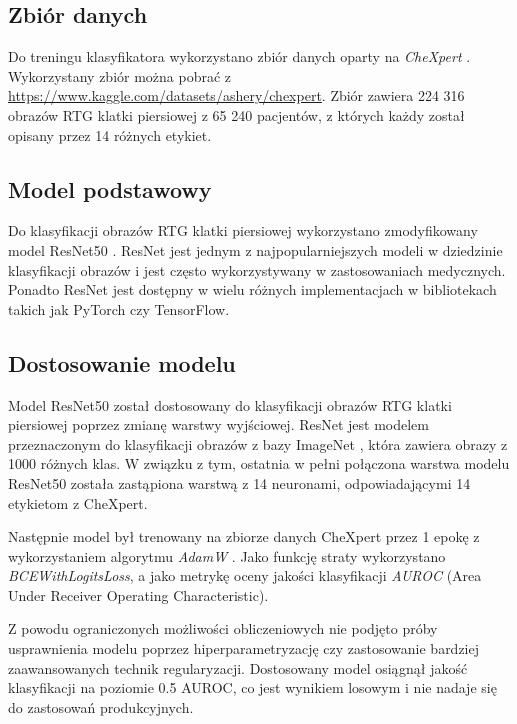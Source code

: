 \documentclass{article}
\begin{document}
\subsection{Zbiór danych}

Do treningu klasyfikatora wykorzystano zbiór danych oparty na \emph{CheXpert} \cite{irvin2019chexpert}.
Wykorzystany zbiór można pobrać z \url{https://www.kaggle.com/datasets/ashery/chexpert}.
Zbiór zawiera 224 316 obrazów RTG klatki piersiowej z 65 240 pacjentów, z których każdy został opisany przez 14 różnych etykiet.

\subsection{Model podstawowy}

Do klasyfikacji obrazów RTG klatki piersiowej wykorzystano zmodyfikowany model ResNet50 \cite{he2016deep}.
ResNet jest jednym z najpopularniejszych modeli w dziedzinie klasyfikacji obrazów i jest często wykorzystywany w zastosowaniach medycznych.
Ponadto ResNet jest dostępny w wielu różnych implementacjach w bibliotekach takich jak PyTorch czy TensorFlow.

\subsection{Dostosowanie modelu}

Model ResNet50 został dostosowany do klasyfikacji obrazów RTG klatki piersiowej poprzez zmianę warstwy wyjściowej.
ResNet jest modelem przeznaczonym do klasyfikacji obrazów z bazy ImageNet \cite{deng2009imagenet}, która zawiera obrazy z 1000 różnych klas.
W związku z tym, ostatnia w pełni połączona warstwa modelu ResNet50 została zastąpiona warstwą z 14 neuronami, odpowiadającymi 14 etykietom z CheXpert.

Następnie model był trenowany na zbiorze danych CheXpert przez 1 epokę z wykorzystaniem algorytmu \emph{AdamW} \cite{loshchilov2019decoupled}.
Jako funkcję straty wykorzystano \emph{BCEWithLogitsLoss}, a jako metrykę oceny jakości klasyfikacji \emph{AUROC} (Area Under Receiver Operating Characteristic).

Z powodu ograniczonych możliwości obliczeniowych nie podjęto próby usprawnienia modelu poprzez hiperparametryzację czy zastosowanie bardziej zaawansowanych technik regularyzacji.
Dostosowany model osiągnął jakość klasyfikacji na poziomie 0.5 AUROC, co jest wynikiem losowym i nie nadaje się do zastosowań produkcyjnych.
\end{document}
